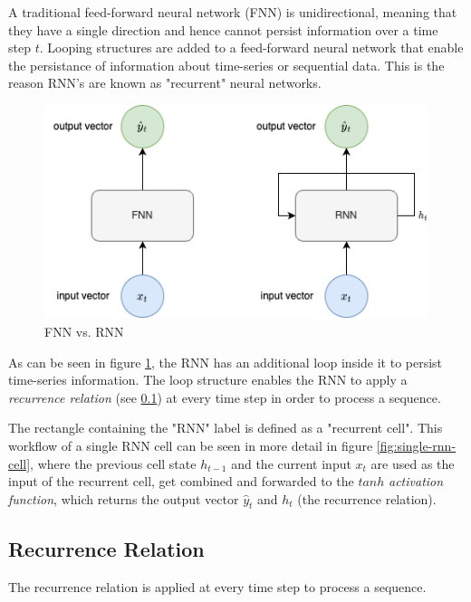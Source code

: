             A traditional feed-forward neural network (FNN) is unidirectional, meaning that they have a single direction and hence cannot persist information over a time step $t$.
            Looping structures are added to a feed-forward neural network that enable the persistance of information about time-series or sequential data. 
            This is the reason RNN's are known as "recurrent" neural networks.
            \begin{figure}[h!]
                \centering
                \includegraphics[scale=0.5]{figures/FNN_vs_RNN.drawio.png}
                \caption{FNN vs. RNN}
                \label{fig:fnn-vs-rnn}
            \end{figure}
            As can be seen in figure \ref{fig:fnn-vs-rnn}, the RNN has an additional loop inside it to persist time-series information. The loop structure enables the RNN to apply a \emph{recurrence relation} (see \ref{sec:recurrence-relation-background}) at every time step in order to process a sequence.

            The rectangle containing the "RNN" label is defined as a "recurrent cell".
            This workflow of a single RNN cell can be seen in more detail in figure \ref{fig:single-rnn-cell}, where the previous cell state $h_{t-1}$ and the current input $x_t$ are used as the input of the recurrent cell, get combined and forwarded to the $tanh$ \emph{activation function}, which returns the output vector $\hat{y}_t$ and $h_t$ (the recurrence relation).

        \subsection{Recurrence Relation}
        \label{sec:recurrence-relation-background}

            The recurrence relation is applied at every time step to process a sequence.

